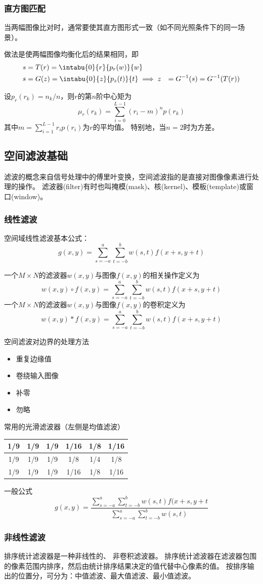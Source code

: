 
\subsubsection{直方图匹配}
当两幅图像比对时，通常要使其直方图形式一致（如不同光照条件下的同一场景）。

做法是使两幅图像均衡化后的结果相同，即
\[\begin{aligned}
s&=T(r)=\intabu{0}{r}{p_r(w)}{w}\\
s&=G(z)=\intabu{0}{z}{p_z(t)}{t}
\implies z&=G^{-1}(s)=G^{-1}(T(r))
\end{aligned}\]

\begin{definition}[$n$阶矩]
设$p_r(r_k)=n_k/n$，则$r$的第$n$阶中心矩为
\[\mu_r(r_k)=\sum_{i=0}^{L-1}(r_i-m)^np(r_k)\]
其中$m=\sum_{i=1}^{L-1}r_ip(r_i)$为$r$的平均值。
特别地，当$n=2$时为方差。
\end{definition}


\subsection{空间滤波基础}
滤波的概念来自信号处理中的傅里叶变换，空间滤波指的是直接对图像像素进行处理的操作。
滤波器(filter)有时也叫掩模(mask)、核(kernel)、模板(template)或窗口(window)。

\subsubsection{线性滤波}
空间域线性滤波基本公式：
\[g(x,y)=\sum_{s=-a}^a\sum_{t=-b}^b w(s,t)f(x+s,y+t)\]

一个$M\times N$的滤波器$w(x,y)$与图像$f(x,y)$的相关操作定义为
\[w(x,y)\circ f(x,y)=\sum_{s=-a}^a\sum_{t=-b}^b w(s,t)f(x+s,y+t)\]
一个$M\times N$的滤波器$w(x,y)$与图像$f(x,y)$的卷积定义为
\[w(x,y)*f(x,y)=\sum_{s=-a}^a\sum_{t=-b}^b w(s,t)f(x+s,y+t)\]

空间滤波对边界的处理方法
\begin{itemize}
	\item 重复边缘值
	\item 卷绕输入图像
	\item 补零
	\item 勿略
\end{itemize}

常用的光滑滤波器（左侧是均值滤波）
\begin{center}
\begin{tabular}{|c|c|c||c|c|c|}\hline
1/9 & 1/9 & 1/9 & 1/16 & 1/8 & 1/16\\\hline
1/9 & 1/9 & 1/9 & 1/8 & 1/4 & 1/8 \\\hline
1/9 & 1/9 & 1/9 & 1/16 & 1/8 & 1/16\\\hline
\end{tabular}
\end{center}

一般公式
\[g(x,y)=\frac{\sum_{s=-a}^a\sum_{t=-b}^b w(s,t)f(x+s,y+t}{\sum_{s=-a}^a\sum_{t=-b}^b w(s,t)}\]

\subsubsection{非线性滤波}
排序统计滤波器是一种非线性的、 非卷积滤波器。
排序统计滤波器在滤波器包围的像素范围内排序，然后由统计排序结果决定的值代替中心像素的值。
按排序输出的位置分，可分为：中值滤波、最大值滤波、最小值滤波。